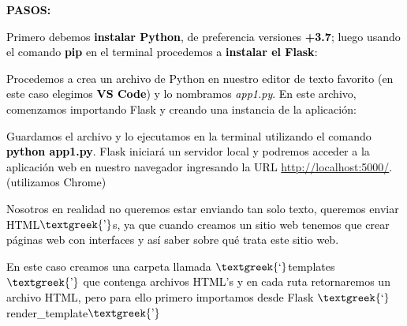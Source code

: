 \documentclass[a4paper]{article}
\begin{document}
\bigskip

{
\textbf{\textcolor{black}{PASOS:}}}

{
\textcolor{black}{Primero debemos }\textbf{\textcolor{black}{instalar Python}}\textcolor{black}{, de preferencia
versiones }\textbf{\textcolor{black}{+3.7}}\textcolor{black}{; luego usando el comando
}\textbf{\textcolor{black}{pip}}\textcolor{black}{ en el terminal procedemos a }\textbf{\textcolor{black}{instalar el
Flask}}\textcolor{black}{:}}




{
\textcolor{black}{Procedemos a crea un archivo de Python en nuestro editor de texto favorito (en este caso elegimos
}\textbf{\textcolor{black}{VS Code}}\textcolor{black}{) y lo nombramos
}\textit{\textcolor{black}{app1.py}}\textcolor{black}{. En este archivo, comenzamos importando Flask y creando una
instancia de la aplicación:}}





\bigskip

{
\textcolor{black}{Guardamos el archivo y lo ejecutamos en la terminal utilizando el comando
}\textbf{\textcolor{black}{python app1.py}}\textcolor{black}{. Flask iniciará un servidor local y podremos acceder a la
aplicación web en nuestro navegador ingresando la URL }\url{http://localhost:5000/}\textcolor{black}{. (utilizamos
Chrome)}}





\bigskip

{
\textcolor{black}{Nosotros en realidad no queremos estar enviando tan solo texto, queremos enviar
HTML$\text{\textgreek{’}}$s, ya que cuando creamos un sitio web tenemos que crear páginas web con interfaces y así
saber sobre qué trata este sitio web.}}

{
\textcolor{black}{En este caso creamos una carpeta llamada $\text{\textgreek{‘}}$templates$\text{\textgreek{’}}$ que
contenga archivos HTML's y en cada ruta retornaremos un archivo HTML, pero para ello primero importamos desde Flask
$\text{\textgreek{‘}}$render\_template$\text{\textgreek{’}}$}}
\end{document}
